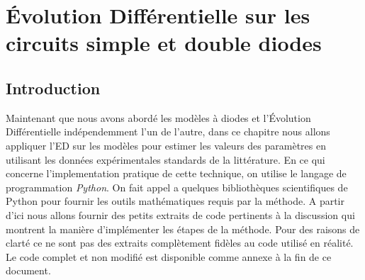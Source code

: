 \chapter{Évolution Différentielle sur les circuits simple et double diodes}

\section{Introduction}
Maintenant que nous avons abordé les modèles à diodes et l'Évolution Différentielle indépendemment l'un de l'autre, dans ce chapitre nous allons appliquer l'ED sur les modèles pour estimer les valeurs des paramètres en utilisant les données expérimentales standards de la littérature. En ce qui concerne l'implementation pratique de cette technique, on utilise le langage de programmation \textit{Python}. On fait appel a quelques bibliothèques scientifiques de Python pour fournir les outils mathématiques requis par la méthode. A partir d'ici nous allons fournir des petits extraits de code pertinents à la discussion qui montrent la manière d'implémenter les étapes de la méthode. Pour des raisons de clarté ce ne sont pas des extraits complètement fidèles au code utilisé en réalité. Le code complet et non modifié est disponible comme annexe à la fin de ce document. 

